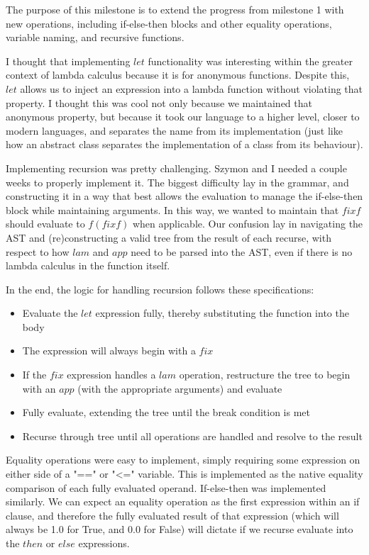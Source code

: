 \documentclass{article}
\theoremstyle{theorem}
\theoremstyle{definition}
\theoremstyle{remark}
\begin{document}
The purpose of this milestone is to extend the progress from milestone 1 with new operations, including if-else-then blocks and other equality operations, variable naming, and recursive functions.

I thought that implementing $let$ functionality was interesting within the greater context of lambda calculus because it is for anonymous functions. Despite this, $let$ allows us to inject an expression into a lambda function without violating that property. I thought this was cool not only because we maintained that anonymous property, but because it took our language to a higher level, closer to modern languages, and separates the name from its implementation (just like how an abstract class separates the implementation of a class from its behaviour).

Implementing recursion was pretty challenging. Szymon and I needed a couple weeks to properly implement it. The biggest difficulty lay in the grammar, and constructing it in a way that best allows the evaluation to manage the if-else-then block while maintaining arguments. In this way, we wanted to maintain that $fix f$ should evaluate to $f(fix f)$ when applicable. Our confusion lay in navigating the AST and (re)constructing a valid tree from the result of each recurse, with respect to how $lam$ and $app$ need to be parsed into the AST, even if there is no lambda calculus in the function itself.

In the end, the logic for handling recursion follows these specifications:

\begin{itemize}
  \item Evaluate the $let$ expression fully, thereby substituting the function into the body
  \item The expression will always begin with a $fix$
  \item If the $fix$ expression handles a $lam$ operation, restructure the tree to begin with an $app$ (with the appropriate arguments) and evaluate
  \item Fully evaluate, extending the tree until the break condition is met
  \item Recurse through tree until all operations are handled and resolve to the result
\end{itemize}

Equality operations were easy to implement, simply requiring some expression on either side of a "==" or "<=" variable. This is implemented as the native equality comparison of each fully evaluated operand. If-else-then was implemented similarly. We can expect an equality operation as the first expression within an if clause, and therefore the fully evaluated result of that expression (which will always be 1.0 for True, and 0.0 for False) will dictate if we recurse evaluate into the $then$ or $else$ expressions.
\end{document}
